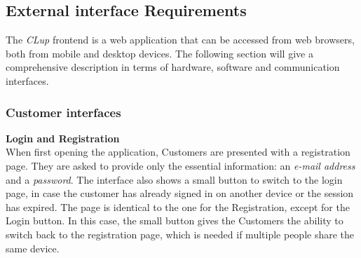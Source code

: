 \subsection{External interface Requirements}
The \emph{CLup} frontend is a web application that can be accessed from web browsers, both from mobile and desktop devices. The following section will give a comprehensive description in terms of hardware, software and communication interfaces.

\subsubsection{Customer interfaces}
\textbf{Login and Registration}\\
\label{page:login}
When first opening the application, Customers are presented with a registration page. They are asked to provide only the essential information: an \emph{e-mail address} and a \emph{password}. The interface also shows a small button to switch to the login page, in case the customer has already signed in on another device or the session has expired. The page is identical to the one for the Registration, except for the Login button. In this case, the small button gives the Customers the ability to switch back to the registration page, which is needed if multiple people share the same device.
